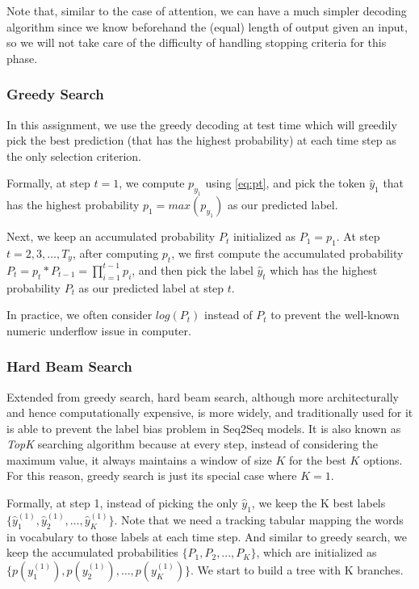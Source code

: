 \documentclass[11pt,a4paper]{article}
\begin{document}
Note that, similar to the case of attention, we can have a much simpler decoding algorithm since we know beforehand the (equal) length of output given an input, so we will not take care of the difficulty of handling stopping criteria for this phase.  

\subsubsection{Greedy Search}
In this assignment, we use the greedy decoding at test time which will greedily pick the best prediction (that has the highest probability) at each time step as the only selection criterion. 

Formally, at step $t=1$, we compute $p_{y_1}$ using \eqref{eq:pt}, and pick the token $\hat{y}_1$ that has the highest probability $p_1 = max(p_{y_1})$ as our predicted label. 

Next, we keep an accumulated probability $P_t$ initialized as $P_1 = p_1$. At step $t = 2, 3, \dots, T_y$, after computing $p_t$, we first compute the accumulated probability $P_t = p_t * P_{t-1} = \prod_{i=1}^{t-1} p_i$, and then pick the label $\hat{y}_t$ which has the highest probability $P_t$ as our predicted label at step $t$. 

In practice, we often consider $log(P_t)$ instead of $P_t$ to prevent the well-known numeric underflow issue in computer. 

\subsubsection{Hard Beam Search}
Extended from greedy search, hard beam search, although more architecturally and hence computationally expensive, is more widely, and traditionally used \cite{seq2seq_2014} for it is able to prevent the label bias problem in Seq2Seq models. It is also known as \textit{TopK} searching algorithm because at every step, instead of considering the maximum value, it always maintains a window of size $K$ for the best $K$ options. For this reason, greedy search is just its special case where $K=1$. 

Formally, at step 1, instead of picking the only $\hat{y}_1$, we keep the K best labels $\{ \hat{y}^{(1)}_{1}, \hat{y}^{(1)}_{2}, \dots, \hat{y}^{(1)}_{K} \}$. Note that we need a tracking tabular mapping the words in vocabulary to those labels at each time step. And similar to greedy search, we keep the accumulated probabilities $\{ P_1, P_2, ..., P_K \}$, which are initialized as 
$\{ p(y^{(1)}_{1}), p(y^{(1)}_{2}), \dots, p(y^{(1)}_{K}) \}$. We start to build a tree with K branches. 
\end{document}
